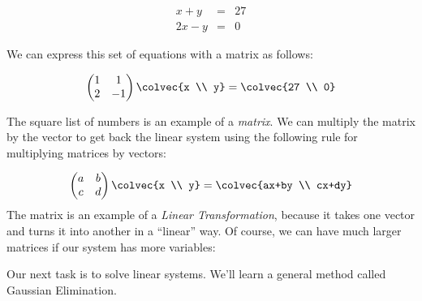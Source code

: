 \begin{eqnarray*}
	x+y & = & 27 \\
	2x-y & = & 0
\end{eqnarray*}

We can express this set of equations with a matrix as follows:

\begin{equation*}
    \begin{pmatrix}
      1             &1  \\
      2             &-1
    \end{pmatrix}
  \colvec{x \\ y}
  =
  \colvec{27 \\ 0}
\end{equation*}

The square list of numbers is an example of a \emph{matrix}.  We can multiply the matrix by the vector to get back the linear system using the following rule for multiplying matrices by vectors:

\begin{equation}\label{2x2multiplication}
    \begin{pmatrix}
      a             &b  \\
      c             &d
    \end{pmatrix}
  \colvec{x \\ y}
  =
  \colvec{ax+by \\ cx+dy}
\end{equation}
\noindent
The matrix is an example of a \emph{Linear Transformation}, because it takes one vector and turns it into another in a ``linear'' way.
Of course, we can have much larger matrices if our system has more variables:



Our next task is to solve linear systems. We'll learn a general method called Gaussian Elimination.








\newpage

